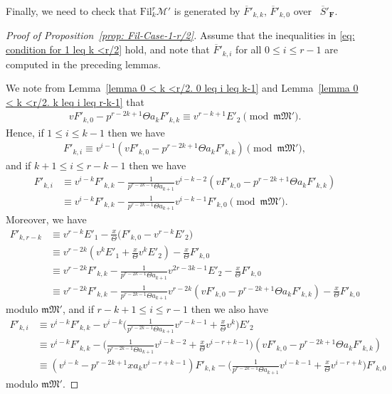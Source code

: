\documentclass[11pt]{amsart}
\theoremstyle{definition}
\numberwithin{equation}{subsection}
\theoremstyle{plain}
\theoremstyle{plain}
\theoremstyle{plain}
\theoremstyle{plain}
\theoremstyle{plain}
\theoremstyle{plain}
\theoremstyle{plain}
\theoremstyle{plain}
\theoremstyle{plain}
\theoremstyle{plain}
\theoremstyle{plain}
\theoremstyle{plain}
\theoremstyle{definition}
\theoremstyle{definition}
\theoremstyle{definition}
\theoremstyle{remark}
\renewcommand{\(}{\textup{(}}
\renewcommand{\)}{\textup{)}}
\newcommand{\F}{\mathbf{F}}
\newcommand{\barS}{\overline{S}}
\newcommand{\cM}{\mathcal{M}}
\newcommand{\fM}{\mathfrak{M}}
\newcommand{\fm}{\mathfrak{m}}
\newcommand{\Fil}{\mathrm{Fil}}
\newcommand{\barF}{\overline{F}}
\begin{document}
Finally, we need to check that $\Fil^r_{k}\cM'$ is generated by $\barF'_{k,k},\,\barF'_{k,0}$ over~ $\barS'_\F$.
\begin{proof}[Proof of Proposition~\ref{prop: Fil-Case-1-r/2}]
Assume that the inequalities in \eqref{eq: condition for 1 leq k <r/2} hold, and note that $\barF'_{k,i}$ for all $0\leq i\leq r-1$ are computed in the preceding lemmas.

We note from Lemma~\ref{lemma 0 < k <r/2. 0 leq i leq k-1} and Lemma~\ref{lemma 0 < k <r/2. k leq i leq r-k-1} that
\begin{align*}
    vF'_{k,0}-p^{r-2k+1}\Theta a_kF'_{k,k} \equiv   v^{r-k+1}E'_2  \pmod{\fm\fM'}.
\end{align*}
Hence, if $1\leq i\leq k-1$ then we have
\begin{align*}
    F'_{k,i}
    \equiv
    v^{i-1}(vF'_{k,0}-p^{r-2k+1}\Theta a_kF'_{k,k})
    \pmod{\fm\fM'},
\end{align*}
and if $k+1\leq i\leq r-k-1$ then we have
\begin{align*}
    F'_{k,i}
    &\equiv
    v^{i-k}F'_{k,k}
    -\frac{1}{p^{r-2k-1}\Theta a_{k+1}}v^{i-k-2}(vF'_{k,0}-p^{r-2k+1}\Theta a_kF'_{k,k})\\
    &\equiv
    v^{i-k}F'_{k,k}-\frac{1}{p^{r-2k-1}\Theta a_{k+1}}v^{i-k-1}F'_{k,0}
    \pmod{\fm\fM'}.
\end{align*}
Moreover, we have
\begin{align*}
    F'_{k,r-k}
    &\equiv
    v^{r-k}E'_1-\frac{x}{\Theta}\big(F'_{k,0}-v^{r-k}E'_2\big)\\
    &\equiv
    v^{r-2k}(v^kE'_1+\frac{x}{\Theta}v^kE'_2)
    -\frac{x}{\Theta}F'_{k,0}\\
    &\equiv
    v^{r-2k}F'_{k,k}-\frac{1}{p^{r-2k-1}\Theta a_{k+1}}v^{2r-3k-1}E'_2
    -\frac{x}{\Theta}F'_{k,0}\\
    &\equiv
     v^{r-2k}F'_{k,k}-\frac{1}{p^{r-2k-1}\Theta a_{k+1}}v^{r-2k}\left(vF'_{k,0}-p^{r-2k+1}\Theta a_kF'_{k,k}\right)
    -\frac{x}{\Theta}F'_{k,0}
\end{align*}
modulo $\fm\fM'$, and if $r-k+1\leq i\leq r-1$ then we also have
\begin{align*}
    F'_{k,i}
    &\equiv
    v^{i-k}F'_{k,k}
    -v^{i-k}\bigg(\frac{1}{p^{r-2k-1}\Theta a_{k+1}}v^{r-k-1}+\frac{x}{\Theta}v^k\bigg)E'_2\\
    &\equiv
    v^{i-k}F'_{k,k}
    -\bigg(\frac{1}{p^{r-2k-1}\Theta a_{k+1}}v^{i-k-2}+\frac{x}{\Theta}v^{i-r+k-1}\bigg)
    (vF'_{k,0}-p^{r-2k+1}\Theta a_kF'_{k,k})\\
    &\equiv
    (v^{i-k}-p^{r-2k+1}xa_kv^{i-r+k-1})F'_{k,k}
    -\bigg(\frac{1}{p^{r-2k-1}\Theta a_{k+1}}v^{i-k-1}+\frac{x}{\Theta}v^{i-r+k}\bigg)F'_{k,0}
\end{align*}
modulo $\fm\fM'$.



\end{proof}
\end{document}
